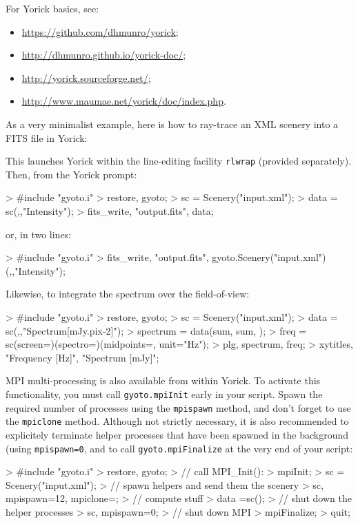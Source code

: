 \documentclass[a4paper,12pt]{article}
\begin{document}
For Yorick basics, see:
\begin{itemize}
\item \url{https://github.com/dhmunro/yorick};
\item \url{http://dhmunro.github.io/yorick-doc/};
\item \url{http://yorick.sourceforge.net/};
\item \url{http://www.maumae.net/yorick/doc/index.php}.
\end{itemize}

As a very minimalist example, here is how to ray-trace an XML
scenery into a FITS file in Yorick:
This launches Yorick within the line-editing facility \texttt{rlwrap}
(provided separately). Then, from the Yorick prompt:
\begin{code}
 > #include "gyoto.i"
 > restore, gyoto;
 > sc = Scenery("input.xml");
 > data = sc(,,"Intensity");
 > fits_write, "output.fits", data;
\end{code}
or, in two lines:
\begin{code}
 > #include "gyoto.i"
 > fits_write, "output.fits", gyoto.Scenery("input.xml")(,,"Intensity");
\end{code}
Likewise, to integrate the spectrum over the field-of-view:
\begin{code}
 > #include "gyoto.i"
 > restore, gyoto;
 > sc = Scenery("input.xml");
 > data = sc(,,"Spectrum[mJy.pix-2]");
 > spectrum = data(sum, sum, );
 > freq = sc(screen=)(spectro=)(midpoints=, unit="Hz");
 > plg, spectrum, freq;
 > xytitles, "Frequency [Hz]", "Spectrum [mJy]";
\end{code}

MPI multi-processing is also available from within Yorick. To activate
this functionality, you must call \texttt{gyoto.mpiInit} early in your
script. Spawn the required number of processes using the
\texttt{mpispawn} method, and don't forget to use the
\texttt{mpiclone} method. Although not strictly necessary, it is also
recommended to explicitely terminate helper processes that have been
spawned in the background (using \texttt{mpispawn=0}, and to call
\texttt{gyoto.mpiFinalize} at the very end of your script:
\begin{code}
 > #include "gyoto.i"
 > restore, gyoto;
 > // call MPI_Init():
 > mpiInit;
 > sc = Scenery("input.xml");
 > // spawn helpers and send them the scenery
 > sc, mpispawn=12, mpiclone=;
 > // compute stuff
 > data =sc();
 > // shut down the helper processes
 > sc, mpispawn=0;
 > // shut down MPI
 > mpiFinalize;
 > quit;
\end{code}
\end{document}
